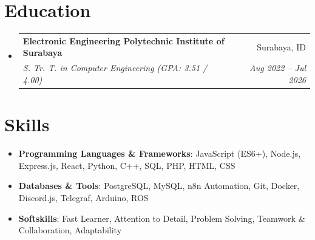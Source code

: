 \documentclass[letterpaper,10pt]{article}
\makeatletter
\newcommand{\resumeItem}[1]{\item\small{#1}}
\newcommand{\resumeSubheading}[4]{
\vspace{-1pt}\item
  \begin{tabular*}{0.97\textwidth}[t]{l@{\extracolsep{\fill}}r}
    \textbf{#1} & #2 \\
    \textit{#3} & \textit{#4} \\
  \end{tabular*}\vspace{-7pt}
}
\newcommand{\resumeSubHeadingList}{\begin{itemize}[leftmargin=0.15in, label={}]}
\newcommand{\resumeSubHeadingListEnd}{\end{itemize}}
\makeatother
\begin{document}
\section{Education}
\resumeSubHeadingList
  \resumeSubheading
      {Electronic Engineering Polytechnic Institute of Surabaya}{Surabaya, ID}
      {S. Tr. T. in Computer Engineering (GPA: 3.51 / 4.00)}{Aug 2022 -- Jul 2026}
\resumeSubHeadingListEnd

\section{Skills}
\resumeSubHeadingList
  \resumeItem{\textbf{Programming Languages \& Frameworks}: JavaScript (ES6+), Node.js, Express.js, React, Python, C++, SQL, PHP, HTML, CSS}
  \resumeItem{\textbf{Databases \& Tools}: PostgreSQL, MySQL, n8n Automation, Git, Docker, Discord.js, Telegraf, Arduino, ROS}
  \resumeItem{\textbf{Softskills}: Fast Learner, Attention to Detail, Problem Solving, Teamwork \& Collaboration, Adaptability}
\resumeSubHeadingListEnd
\end{document}
